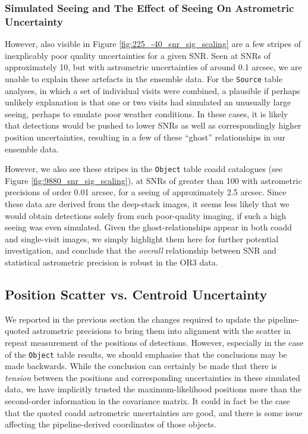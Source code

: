 \documentclass[SE,authoryear,toc]{lsstdoc}
\begin{document}
\subsubsection{Simulated Seeing and The Effect of Seeing On Astrometric Uncertainty}
However, also visible in Figure \ref{fig:225_-40_snr_sig_scaling} are a few stripes of inexplicably poor quality uncertainties for a given SNR.
Seen at SNRs of approximately 10, but with astrometric uncertainties of around 0.1 arcsec, we are unable to explain these artefacts in the ensemble data.
For the \texttt{Source} table analyses, in which a set of individual visits were combined, a plausible if perhaps unlikely explanation is that one or two visits had simulated an unusually large seeing, perhaps to emulate poor weather conditions.
In these cases, it is likely that detections would be pushed to lower SNRs as well as correspondingly higher position uncertainties, resulting in a few of these ``ghost'' relationships in our ensemble data.

However, we also see these stripes in the \texttt{Object} table coadd catalogues (see Figure \ref{fig:9880_snr_sig_scaling}), at SNRs of greater than 100 with astrometric precisions of order 0.01 arcsec, for a seeing of approximately 2.5 arcsec.
Since these data are derived from the deep-stack images, it seems less likely that we would obtain detections solely from such poor-quality imaging, if such a high seeing was even simulated.
Given the ghost-relationships appear in both coadd and single-visit images, we simply highlight them here for further potential investigation, and conclude that the \textit{overall} relationship between SNR and statistical astrometric precision is robust in the OR3 data.

\subsection{Position Scatter vs. Centroid Uncertainty}
We reported in the previous section the changes required to update the pipeline-quoted astrometric precisions to bring them into alignment with the scatter in repeat measurement of the positions of detections.
However, especially in the case of the \texttt{Object} table results, we should emphasise that the conclusions may be made backwards.
While the conclusion can certainly be made that there is \textit{tension} between the positions and corresponding uncertainties in these simulated data, we have implicitly trusted the maximum-likelihood positions more than the second-order information in the covariance matrix.
It could in fact be the case that the quoted coadd astrometric uncertainties are good, and there is some issue affecting the pipeline-derived coordinates of those objects.
\end{document}
